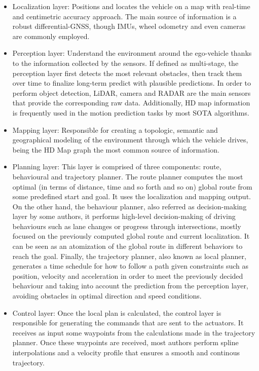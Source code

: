 \begin{itemize}
	\item Localization layer: Positions and locates the vehicle on a map with real-time and centimetric accuracy approach. The main source of information is a robust differential-GNSS, though IMUs, wheel odometry and even cameras are commonly employed. 
	\item Perception layer: Understand the environment around the ego-vehicle thanks to the information collected by the sensors. If defined as multi-stage, the perception layer first detects the most relevant obstacles, then track them over time to finalize long-term predict with plausible predictions. In order to perform object detection, LiDAR, camera and RADAR are the main sensors that provide the corresponding raw data. Additionally, HD map information is frequently used in the motion prediction tasks by most \ac{SOTA} algorithms.
	\item Mapping layer: Responsible for creating a topologic, semantic and geographical modeling of the environment through which the vehicle drives, being the HD Map graph the most common source of information.
	\item Planning layer: This layer is comprised of three components: route, behavioural and trajectory planner. The route planner computes the most optimal (in terms of distance, time and so forth and so on) global route from some predefined start and goal. It uses the localization and mapping output. On the other hand, the behaviour planner, also referred as decision-making layer by some authors, it performs high-level decision-making of driving behaviours such as lane changes or progress through intersections, mostly focused on the previously computed global route and current localization. It can be seen as an atomization of the global route in different behaviors to reach the goal. Finally, the trajectory planner, also known as local planner, generates a time schedule for how to follow a path given constraints such as position, velocity and acceleration in order to meet the previously decided behaviour and taking into account the prediction from the perception layer, avoiding obstacles in optimal direction and speed conditions.
	\item Control layer: Once the local plan is calculated, the control layer is responsible for generating the commands that are sent to the actuators. It receives as input some waypoints from the calculations made in the trajectory planner. Once these waypoints are received, most authors perform spline interpolations and a velocity profile that ensures a smooth and continous trajectory. 
\end{itemize}

